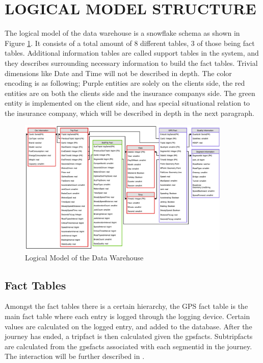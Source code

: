 \section{LOGICAL MODEL STRUCTURE}\label{sec:dataware}

The logical model of the data warehouse is a snowflake schema as shown in Figure \ref{fig:datawarehouse}. It consists of a total amount of 8 different tables, 3 of those being fact tables. Additional information tables are called support tables in the system, and they describes surrounding necessary information to build the fact tables. Trivial dimensions like Date and Time will not be described in depth. The color encoding is as following; Purple entities are solely on the clients side, the red entities are on both the clients side and the insurance companys side. The green entity is implemented on the client side, and has special situational relation to the insurance company, which will be described in depth in the next paragraph.

\begin{figure}[tb]
\centering
\includegraphics[width=0.9\textwidth]{Pictures/ERDiagram}
\caption{Logical Model of the Data Warehouse}
\label{fig:datawarehouse}
\end{figure}

\subsection{Fact Tables}

Amongst the fact tables there is a certain hierarchy, the GPS fact table is the main fact table where each entry is logged through the logging device. Certain values are calculated on the logged entry, and added to the database. After the journey has ended, a tripfact is then calculated given the gpsfacts. Subtripfacts are calculated from the gpsfacts associated with each segmentid in the journey. The interaction will be further described in . 

